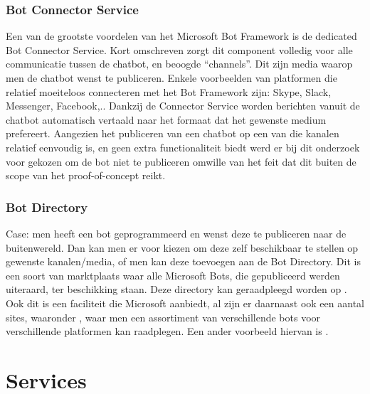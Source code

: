 \subsubsection{Bot Connector Service}
Een van de grootste voordelen van het Microsoft Bot Framework is de dedicated Bot Connector Service. Kort omschreven zorgt dit component volledig voor alle communicatie tussen de chatbot, en beoogde “channels”. Dit zijn media waarop men de chatbot wenst te publiceren. Enkele voorbeelden van platformen die relatief moeiteloos connecteren met het Bot Framework zijn: Skype, Slack, Messenger, Facebook,.. Dankzij de Connector Service worden berichten vanuit de chatbot automatisch vertaald naar het formaat dat het gewenste medium prefereert. Aangezien het publiceren van een chatbot op een van die kanalen relatief eenvoudig is, en geen extra functionaliteit biedt werd er bij dit onderzoek voor gekozen om de bot niet te publiceren omwille van het feit dat dit buiten de scope van het proof-of-concept reikt. 

\subsubsection{Bot Directory}
Case: men heeft een bot geprogrammeerd en wenst deze te publiceren naar de buitenwereld. Dan kan men er voor kiezen om deze zelf beschikbaar te stellen op gewenste kanalen/media, of men kan deze toevoegen aan de Bot Directory. Dit is een soort van marktplaats waar alle Microsoft Bots, die gepubliceerd werden uiteraard, ter beschikking staan. Deze directory kan geraadpleegd worden op \textcite{Microsoft2019}. Ook dit is een faciliteit die Microsoft aanbiedt, al  zijn er daarnaast ook een aantal sites, waaronder \textcite{botfinderio2019}, waar men een assortiment van verschillende bots voor verschillende platformen kan raadplegen. Een ander voorbeeld hiervan is \textcite{Line2019}. 

\section{Services}
